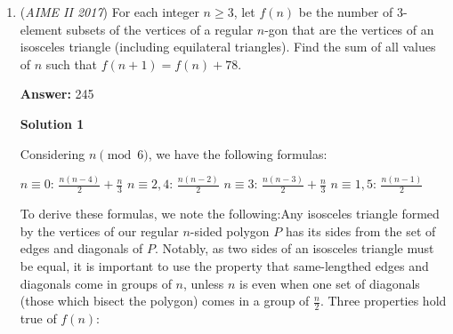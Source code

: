 \begin{enumerate}
 Let the distance from $B$ to $(1,0)$ be $x$. As $B$ is invariant, $x = r(BB' + x) \implies x = r\frac{d\sqrt{2}}{1-r}$. Then by Power of a Point, $x(BB' + x) = (1-d)(1+d) \implies xr(BB' + x) = r(1-d)(1+d) \implies x^2 = r(1-d^2) \implies d^2 = \left(1 + \frac{2r}{(1-r)^2}\right)$. Solving, $d = \frac{49}{61}$. Our answer is $49+61=\boxed{110}$

 -Isogonal

 



\textbf{Solution 5 (complex)}

Let $A_0$ be the origin. Now note that the ratio of lengths of consecutive line segments is constant and equal to $r$. Now accounting for rotation by $\frac{\pi}{2}$ radians, we see that the common ratio is $ri$. Thus since our first term is $A_1=-r+ri$, the total sum (by geometric series formula) is $\frac{-r+ri}{1-ri}=\frac{-781+538i}{3721}$. We need the distance from $C_0=-1$ so our distance is $|B-C_0|=\sqrt{\left(\frac{-781}{3721}-(-1)\right)^2+\left(\frac{538i}{3721}\right)^2}=\sqrt{\frac{2401}{3721}}=\frac{49}{61}$. Our answer is $49+61=\boxed{110}$

 -chrisdiamond10

 By the way, \href{https://www.geogebra.org/calculator/wrtgmqmq}{here's} a Geogebra Diagram. ~r00tsOfUnity

 


	\item (\textit{AIME II 2017}) For each integer $n\geq3$, let $f(n)$ be the number of $3$-element subsets of the vertices of a regular $n$-gon that are the vertices of an isosceles triangle (including equilateral triangles). Find the sum of all values of $n$ such that $f(n+1)=f(n)+78$.


 
 \textbf{Answer: }245



\textbf{Solution 1}

Considering $n \pmod{6}$, we have the following formulas:

 $n\equiv 0$: $\frac{n(n-4)}{2} + \frac{n}{3}$
$n\equiv 2, 4$: $\frac{n(n-2)}{2}$
$n\equiv 3$: $\frac{n(n-3)}{2} + \frac{n}{3}$
$n\equiv 1, 5$: $\frac{n(n-1)}{2}$

 To derive these formulas, we note the following:Any isosceles triangle formed by the vertices of our regular $n$-sided polygon $P$ has its sides from the set of edges and diagonals of $P$. Notably, as two sides of an isosceles triangle must be equal, it is important to use the property that same-lengthed edges and diagonals come in groups of $n$, unless $n$ is even when one set of diagonals (those which bisect the polygon) comes in a group of $\frac{n}{2}$. Three properties hold true of $f(n)$:


\end{enumerate}
